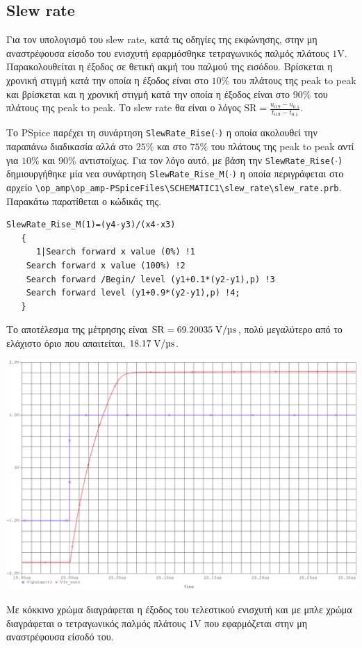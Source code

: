 \subsection{Slew rate}
Για τον υπολογισμό του slew rate, κατά τις οδηγίες της εκφώνησης, στην μη αναστρέφουσα είσοδο του ενισχυτή εφαρμόσθηκε τετραγωνικός παλμός πλάτους $1\unit{\volt}$. Παρακολουθείται η έξοδος σε θετική ακμή του παλμού της εισόδου. Βρίσκεται η χρονική στιγμή κατά την οποία η έξοδος είναι στο $10\%$ του πλάτους της peak to peak και βρίσκεται και η χρονική στιγμή κατά την οποία η έξοδος είναι στο $90\%$ του πλάτους της peak to peak. Το slew rate θα είναι ο λόγος $\mathrm{SR}=\displaystyle{\frac{u_{0.9}-u_{0.1}}{t_{0.9}-t_{0.1}}}$.\par
Το PSpice παρέχει τη συνάρτηση \texttt{SlewRate\_Rise($\cdot$)} η οποία ακολουθεί την παραπάνω διαδικασία αλλά στο $25\%$ και στο $75\%$ του πλάτους της peak to peak αντί για $10\%$ και $90\%$ αντιστοίχως. Για τον λόγο αυτό, με βάση την \texttt{SlewRate\_Rise($\cdot$)} δημιουργήθηκε μία νεα συνάρτηση \texttt{SlewRate\_Rise\_M($\cdot$)} η οποία περιγράφεται στο αρχείο \texttt{\textbackslash op\_amp\textbackslash op\_amp-PSpiceFiles\textbackslash SCHEMATIC1\textbackslash slew\_rate\textbackslash slew\_rate.prb}. Παρακάτω παρατίθεται ο κώδικάς της.\par
\footnotesize{\begin{verbatim}
SlewRate_Rise_M(1)=(y4-y3)/(x4-x3)
   {
      1|Search forward x value (0%) !1
	Search forward x value (100%) !2
	Search forward /Begin/ level (y1+0.1*(y2-y1),p) !3
	Search forward level (y1+0.9*(y2-y1),p) !4;
   }
\end{verbatim}}

Το αποτέλεσμα της μέτρησης είναι $\mathrm{SR}=69.20035\;\unit{\volt\per{\micro\second}}$, πολύ μεγαλύτερο από το ελάχιστο όριο που απαιτείται, $18.17\;\unit{\volt\per{\micro\second}}$.\par

\begin{center}
	\begin{plotenv}[H]
		\centering
		\includegraphics[width=\linewidth]{op_amp_sim/slew_rate.pdf}
		\caption{Με κόκκινο χρώμα διαγράφεται η έξοδος του τελεστικού ενισχυτή και με μπλε χρώμα διαγράφεται ο τετραγωνικός παλμός πλάτους $1\unit{\volt}$ που εφαρμόζεται στην μη αναστρέφουσα είσοδό του.}
		\label{plot:slew_rate}
	\end{plotenv}
\end{center}

